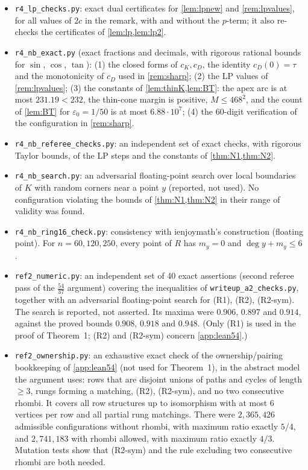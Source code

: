 \documentclass[11pt]{amsart}
\theoremstyle{definition}
\theoremstyle{remark}
\newcommand{\eps}{\varepsilon}
\begin{document}
\begin{itemize}[leftmargin=2em]
\item \texttt{r4\_lp\_checks.py}: exact dual certificates for \cref{lem:lpnew} and \cref{rem:lpvalues}, for all values of $2c$ in the remark, with and without the $p$-term; it also re-checks the certificates of \cref{lem:lp,lem:lp2}.
\item \texttt{r4\_nb\_exact.py} (exact fractions and decimals, with rigorous rational bounds for $\sin$, $\cos$, $\tan$): (1) the closed forms of $c_K,c_D$, the identity $c_D(0)=\tau$ and the monotonicity of $c_D$ used in \cref{rem:sharp}; (2) the LP values of \cref{rem:lpvalues}; (3) the constants of \cref{lem:thinK,lem:BT}: the apex arc is at most $231.19<232$, the thin-cone margin is positive, $M\le468^2$, and the count of \cref{lem:BT} for $\eps_0=1/50$ is at most $6.88\cdot10^7$; (4) the $60$-digit verification of the configuration in \cref{rem:sharp}.
\item \texttt{r4\_nb\_referee\_checks.py}: an independent set of exact checks, with rigorous Taylor bounds, of the LP steps and the constants of \cref{thm:N1,thm:N2}.
\item \texttt{r4\_nb\_search.py}: an adversarial floating-point search over local boundaries of $K$ with random corners near a point $y$ (reported, not used). No configuration violating the bounds of \cref{thm:N1,thm:N2} in their range of validity was found.
\item \texttt{r4\_nb\_ring16\_check.py}: consistency with ienjoymath's construction (floating point). For $n=60,120,250$, every point of $R$ has $m_y=0$ and $\deg y+m_y\le6$.
\item \texttt{ref2\_numeric.py}: an independent set of 40 exact assertions (second referee pass of the $\frac{54}{37}$ argument) covering the inequalities of \texttt{writeup\_a2\_checks.py}, together with an adversarial floating-point search for (R1), (R2), (R2-sym). The search is reported, not asserted. Its maxima were $0.906$, $0.897$ and $0.914$, against the proved bounds $0.908$, $0.918$ and $0.948$. (Only (R1) is used in the proof of Theorem~1; (R2) and (R2-sym) concern \cref{app:lean54}.)
\item \texttt{ref2\_ownership.py}: an exhaustive exact check of the ownership/pairing bookkeeping of \cref{app:lean54} (not used for Theorem~1), in the abstract model the argument uses: rows that are disjoint unions of paths and cycles of length $\ge3$, rungs forming a matching, (R2), (R2-sym), and no two consecutive rhombi. It covers all row structures up to isomorphism with at most $6$ vertices per row and all partial rung matchings. There were $2{,}365{,}426$ admissible configurations without rhombi, with maximum ratio exactly $5/4$, and $2{,}741{,}183$ with rhombi allowed, with maximum ratio exactly $4/3$. Mutation tests show that (R2-sym) and the rule excluding two consecutive rhombi are both needed.

\end{itemize}
\end{document}
